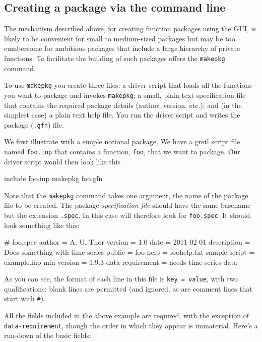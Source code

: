 \subsection{Creating a package via the command line}

The mechanism described above, for creating function packages using
the GUI, is likely to be convenient for small to medium-sized packages
but may be too cumbersome for ambitious packages that include a large
hierarchy of private functions. To facilitate the building of such
packages  offers the \texttt{makepkg} command.

To use \texttt{makepkg} you create three files: a driver script that
loads all the functions you want to package and invokes
\texttt{makepkg}; a small, plain-text specification file that contains
the required package details (author, version, etc.); and (in the
simplest case) a plain text help file.  You run the driver script and
 writes the package (\texttt{.gfn}) file.

We first illustrate with a simple notional package. We have a gretl
script file named \texttt{foo.inp} that contains a function,
\texttt{foo}, that we want to package. Our driver script would then
look like this
%
\begin{code}
include foo.inp
makepkg foo.gfn
\end{code}
%
Note that the \texttt{makepkg} command takes one argument, the name of
the package file to be created. The package \emph{specification file}
should have the same basename but the extension \texttt{.spec}. In
this case  will therefore look for \texttt{foo.spec}. It
should look something like this:
%
\begin{code}
# foo.spec
author = A. U. Thor
version = 1.0
date = 2011-02-01
description = Does something with time series
public = foo 
help = foohelp.txt
sample-script = example.inp
min-version = 1.9.3
data-requirement = needs-time-series-data
\end{code}

As you can see, the format of each line in this file is \texttt{key =
  value}, with two qualifications: blank lines are permitted (and
ignored, as are comment lines that start with \verb|#|). 

All the fields included in the above example are required, with the
exception of \texttt{data-requirement}, though the order in which they
appear is immaterial. Here's a run-down of the basic fields:

